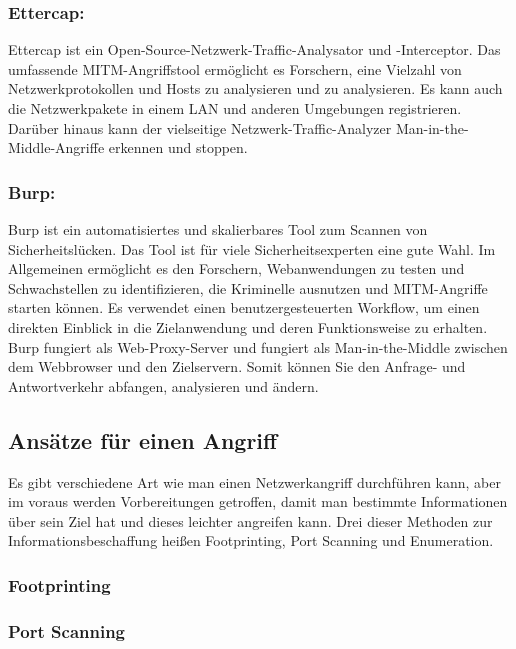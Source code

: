 \subsubsection{Ettercap:}
Ettercap ist ein Open-Source-Netzwerk-Traffic-Analysator und -Interceptor. Das umfassende MITM-Angriffstool ermöglicht es Forschern, eine Vielzahl von Netzwerkprotokollen und Hosts zu analysieren und zu analysieren. Es kann auch die Netzwerkpakete in einem LAN und anderen Umgebungen registrieren. Darüber hinaus kann der vielseitige Netzwerk-Traffic-Analyzer Man-in-the-Middle-Angriffe erkennen und stoppen.\cite{ref_url10}\par

\subsubsection{Burp:}
Burp ist ein automatisiertes und skalierbares Tool zum Scannen von Sicherheitslücken. Das Tool ist für viele Sicherheitsexperten eine gute Wahl. Im Allgemeinen ermöglicht es den Forschern, Webanwendungen zu testen und Schwachstellen zu identifizieren, die Kriminelle ausnutzen und MITM-Angriffe starten können. Es verwendet einen benutzergesteuerten Workflow, um einen direkten Einblick in die Zielanwendung und deren Funktionsweise zu erhalten. Burp fungiert als Web-Proxy-Server und fungiert als Man-in-the-Middle zwischen dem Webbrowser und den Zielservern. Somit können Sie den Anfrage- und Antwortverkehr abfangen, analysieren und ändern.\cite{ref_url10}\par

\subsection{Ansätze für einen Angriff}
Es gibt verschiedene Art wie man einen Netzwerkangriff durchführen kann, aber im voraus werden Vorbereitungen getroffen, damit man bestimmte Informationen über sein Ziel hat und dieses leichter angreifen kann. Drei dieser Methoden zur Informationsbeschaffung heißen Footprinting, Port Scanning und Enumeration.

\subsubsection{Footprinting}



\subsubsection{Port Scanning}



